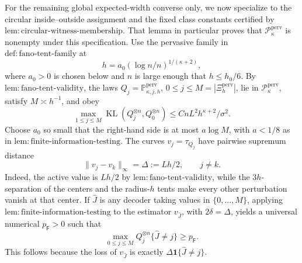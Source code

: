 For the remaining global expected-width converse only, we now specialize to the circular inside--outside assignment and the fixed class constants certified by \(\mathrm{lem:circular\text{-}witness\text{-}membership}\). That lemma in particular proves that \(\mathcal P_{\kappa}^{\mathrm{perv}}\) is nonempty under this specification. Use the pervasive family in \(\mathrm{def:fano\text{-}tent\text{-}family}\) at
\[
 h=a_0(\log n/n)^{1/(\kappa+2)},
\]
where \(a_0>0\) is chosen below and \(n\) is large enough that \(h\le h_0/6\). By \(\mathrm{lem:fano\text{-}tent\text{-}validity}\), the laws \(Q_j=\mathbb P_{\kappa,j,h}^{\mathrm{perv}}\), \(0\le j\le M=|\Xi_h^{\mathrm{perv}}|\), lie in \(\mathcal P_{\kappa}^{\mathrm{perv}}\), satisfy \(M\asymp h^{-1}\), and obey
\[
 \max_{1\le j\le M}\operatorname{KL}(Q_j^{\otimes n},Q_0^{\otimes n})
 \le CnL^2h^{\kappa+2}/\sigma^2. \tag{29}
\]
Choose \(a_0\) so small that the right-hand side is at most \(a\log M\), with \(a<1/8\) as in \(\mathrm{lem:finite\text{-}information\text{-}testing}\). The curves \(v_j=\tau_{Q_j}\) have pairwise supremum distance
\[
 \lVert v_j-v_k\rVert_\infty=\Delta:=Lh/2,
 \qquad j\ne k. \tag{30}
\]
Indeed, the active value is \(Lh/2\) by \(\mathrm{lem:fano\text{-}tent\text{-}validity}\), while the \(3h\)-separation of the centers and the radius-\(h\) tents make every other perturbation vanish at that center. If \(\widehat J\) is any decoder taking values in \(\{0,\ldots,M\}\), applying \(\mathrm{lem:finite\text{-}information\text{-}testing}\) to the estimator \(v_{\widehat J}\), with \(2\delta=\Delta\), yields a universal numerical \(p_{\mathsf F}>0\) such that
\[
 \max_{0\le j\le M}Q_j^{\otimes n}\{\widehat J\ne j\}\ge p_{\mathsf F}. \tag{31}
\]
This follows because the loss of \(v_{\widehat J}\) is exactly \(\Delta\mathbf 1\{\widehat J\ne j\}\).

